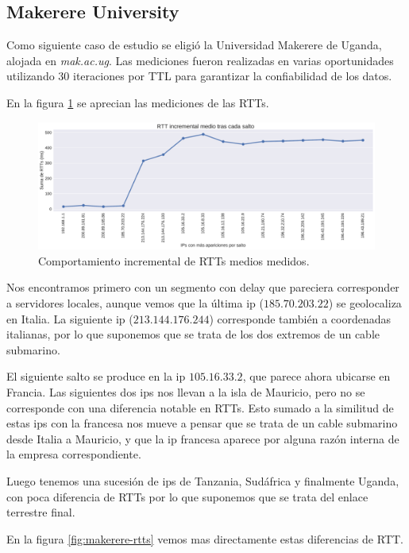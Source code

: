 \subsection{Makerere University}

Como siguiente caso de estudio se eligió la Universidad Makerere de Uganda, alojada en \emph{mak.ac.ug}. Las mediciones fueron realizadas en varias oportunidades utilizando 30 iteraciones por TTL para garantizar la confiabilidad de los datos.

En la figura \ref{fig:makerere-incrementales} se aprecian las mediciones de las RTTs.

\begin{figure}[H]
    \centering
    \includegraphics[width=1\textwidth, height=1\textheight, keepaspectratio]{../img/mak-ac-ug-incrementales}
    \caption{Comportamiento incremental de RTTs medios medidos.}
    \label{fig:makerere-incrementales}
\end{figure}

Nos encontramos primero con un segmento con delay que pareciera corresponder a servidores locales, aunque vemos que la última ip ($185.70.203.22$) se geolocaliza en Italia. La siguiente ip ($213.144.176.244$) corresponde también a coordenadas italianas, por lo que suponemos que se trata de los dos extremos de un cable submarino.

El siguiente salto se produce en la ip $105.16.33.2$, que parece ahora ubicarse en Francia.
Las siguientes dos ips nos llevan a la isla de Mauricio, pero no se corresponde con una diferencia notable en RTTs. Esto sumado a la similitud de estas ips con la francesa nos mueve a pensar que se trata de un cable submarino desde Italia a Mauricio, y que la ip francesa aparece por alguna razón interna de la empresa correspondiente.

Luego tenemos una sucesión de ips de Tanzania, Sudáfrica y finalmente Uganda, con poca diferencia de RTTs por lo que suponemos que se trata del enlace terrestre final.

En la figura \ref{fig:makerere-rtts} vemos mas directamente estas diferencias de RTT.

